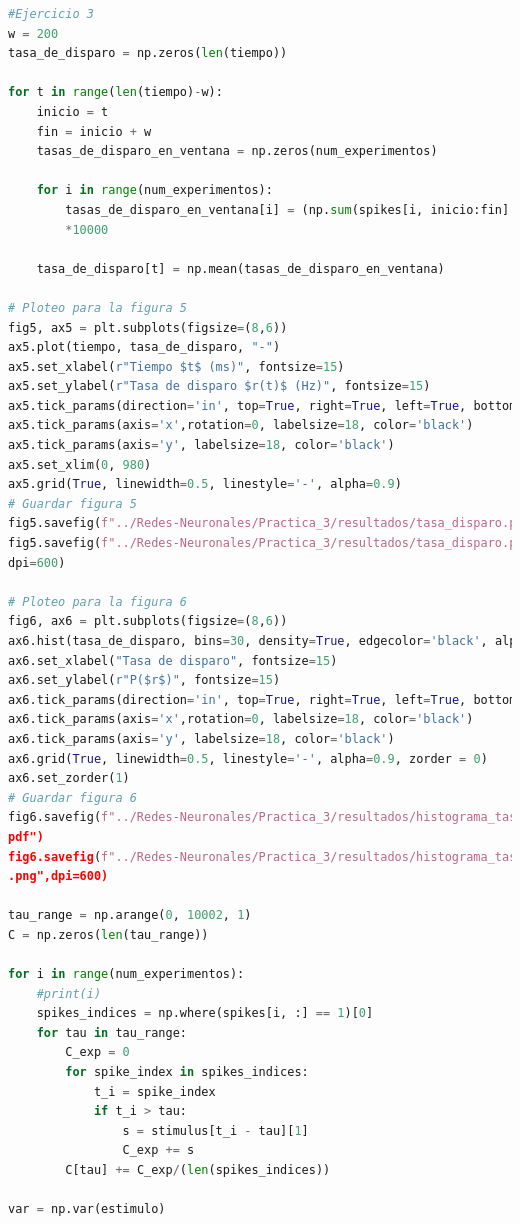\documentclass[11pt,twocolumn,twoside]{opticajnl}
\begin{document}
\begin{onecolumn}
\begin{lstlisting}[language=Python, caption={Implementación del método Runge-Kutta 4.}, label=python-code]
#Ejercicio 3
w = 200
tasa_de_disparo = np.zeros(len(tiempo))

for t in range(len(tiempo)-w):
    inicio = t  
    fin = inicio + w
    tasas_de_disparo_en_ventana = np.zeros(num_experimentos)

    for i in range(num_experimentos):
        tasas_de_disparo_en_ventana[i] = (np.sum(spikes[i, inicio:fin] == 1)/w)
        *10000
    
    tasa_de_disparo[t] = np.mean(tasas_de_disparo_en_ventana)
            
# Ploteo para la figura 5
fig5, ax5 = plt.subplots(figsize=(8,6)) 
ax5.plot(tiempo, tasa_de_disparo, "-")
ax5.set_xlabel(r"Tiempo $t$ (ms)", fontsize=15)
ax5.set_ylabel(r"Tasa de disparo $r(t)$ (Hz)", fontsize=15)
ax5.tick_params(direction='in', top=True, right=True, left=True, bottom=True)
ax5.tick_params(axis='x',rotation=0, labelsize=18, color='black')
ax5.tick_params(axis='y', labelsize=18, color='black')
ax5.set_xlim(0, 980)
ax5.grid(True, linewidth=0.5, linestyle='-', alpha=0.9)
# Guardar figura 5
fig5.savefig(f"../Redes-Neuronales/Practica_3/resultados/tasa_disparo.pdf")
fig5.savefig(f"../Redes-Neuronales/Practica_3/resultados/tasa_disparo.png",
dpi=600)

# Ploteo para la figura 6
fig6, ax6 = plt.subplots(figsize=(8,6)) 
ax6.hist(tasa_de_disparo, bins=30, density=True, edgecolor='black', alpha=0.7)
ax6.set_xlabel("Tasa de disparo", fontsize=15)
ax6.set_ylabel(r"P($r$)", fontsize=15)
ax6.tick_params(direction='in', top=True, right=True, left=True, bottom=True)
ax6.tick_params(axis='x',rotation=0, labelsize=18, color='black')
ax6.tick_params(axis='y', labelsize=18, color='black')
ax6.grid(True, linewidth=0.5, linestyle='-', alpha=0.9, zorder = 0)
ax6.set_zorder(1)
# Guardar figura 6
fig6.savefig(f"../Redes-Neuronales/Practica_3/resultados/histograma_tasa_disparo.
pdf")
fig6.savefig(f"../Redes-Neuronales/Practica_3/resultados/histograma_tasa_disparo
.png",dpi=600)

tau_range = np.arange(0, 10002, 1) 
C = np.zeros(len(tau_range))   

for i in range(num_experimentos):
    #print(i)
    spikes_indices = np.where(spikes[i, :] == 1)[0]
    for tau in tau_range:
        C_exp = 0
        for spike_index in spikes_indices:
            t_i = spike_index
            if t_i > tau:
                s = stimulus[t_i - tau][1]
                C_exp += s
        C[tau] += C_exp/(len(spikes_indices))

var = np.var(estimulo)


\end{lstlisting}
\end{onecolumn}
\end{document}
